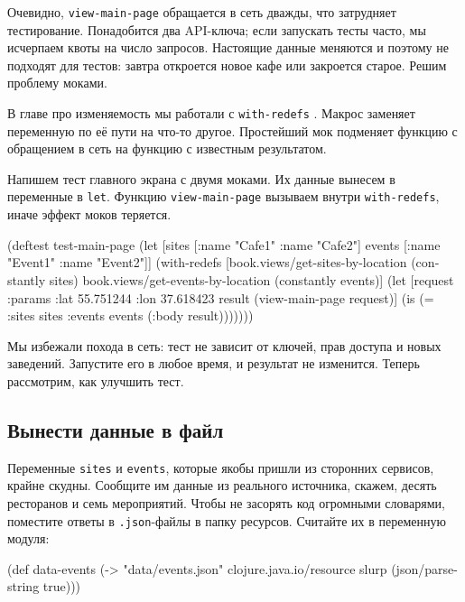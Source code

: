 Очевидно, \verb|view-main-page| обращается в сеть дважды, что затрудняет
тестирование. Понадобится два API-ключа; если запускать тесты часто, мы
исчерпаем квоты на число запросов. Настоящие данные меняются и поэтому не
подходят для тестов: завтра откроется новое кафе или закроется старое. Решим
проблему моками.


В главе про изменяемость мы работали с \verb|with-redefs| .
Макрос заменяет переменную по её пути на что-то другое. Простейший мок подменяет
функцию с обращением в сеть на функцию с известным результатом.

Напишем тест главного экрана с двумя моками. Их данные вынесем в переменные в
\verb|let|. Функцию \verb|view-main-page| вызываем  внутри
\verb|with-redefs|, иначе эффект моков теряется.

\begin{english}
  \begin{clojure}
(deftest test-main-page
  (let [sites [{:name "Cafe1"} {:name "Cafe2"}]
        events [{:name "Event1"} {:name "Event2"}]]
    (with-redefs
      [book.views/get-sites-by-location (constantly sites)
       book.views/get-events-by-location (constantly events)]
      (let [request {:params {:lat 55.751244
                              :lon 37.618423}}
            result (view-main-page request)]
        (is (= {:sites sites :events events}
               (:body result)))))))
  \end{clojure}
\end{english}

Мы избежали похода в сеть: тест не зависит от ключей, прав доступа и новых
заведений. Запустите его в любое время, и результат не изменится. Теперь
рассмотрим, как улучшить тест.

\subsection{Вынести данные в файл}

Переменные \verb|sites| и \verb|events|, которые якобы пришли из сторонних
сервисов, крайне скудны. Сообщите им данные из реального источника, скажем,
десять ресторанов и семь мероприятий. Чтобы не засорять код огромными словарями,
поместите ответы в \verb|.json|-файлы в папку ресурсов. Считайте их в переменную
модуля:


\begin{english}
  \begin{clojure}
(def data-events
  (-> "data/events.json"
      clojure.java.io/resource
      slurp
      (json/parse-string true)))
  \end{clojure}
\end{english}

